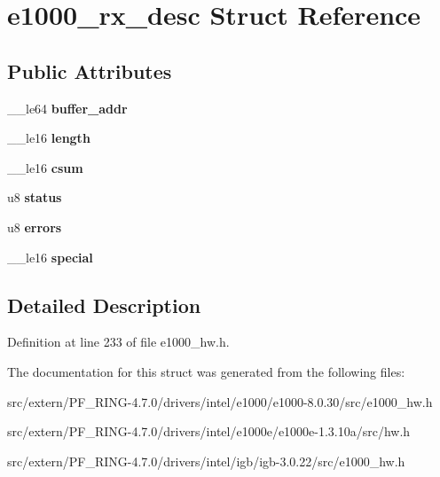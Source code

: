 \hypertarget{structe1000__rx__desc}{
\section{e1000\_\-rx\_\-desc Struct Reference}
\label{structe1000__rx__desc}
}
\subsection*{Public Attributes}
\begin{DoxyCompactItemize}
\item 
\hypertarget{structe1000__rx__desc_acadacc730a6c13cd4bfaea57293bcc6e}{
\_\-\_\-le64 {\bfseries buffer\_\-addr}}
\label{structe1000__rx__desc_acadacc730a6c13cd4bfaea57293bcc6e}

\item 
\hypertarget{structe1000__rx__desc_ae402b87f2ca726c23148f90b55e9b92e}{
\_\-\_\-le16 {\bfseries length}}
\label{structe1000__rx__desc_ae402b87f2ca726c23148f90b55e9b92e}

\item 
\hypertarget{structe1000__rx__desc_ab9239224d6d77002327d0f0809648f5b}{
\_\-\_\-le16 {\bfseries csum}}
\label{structe1000__rx__desc_ab9239224d6d77002327d0f0809648f5b}

\item 
\hypertarget{structe1000__rx__desc_a810f7d117dca2cba78b290e50840283d}{
u8 {\bfseries status}}
\label{structe1000__rx__desc_a810f7d117dca2cba78b290e50840283d}

\item 
\hypertarget{structe1000__rx__desc_a601904e57979b1e95bb3c1a5950946b9}{
u8 {\bfseries errors}}
\label{structe1000__rx__desc_a601904e57979b1e95bb3c1a5950946b9}

\item 
\hypertarget{structe1000__rx__desc_a29296807f2de0bc9b68cb42c1ad298df}{
\_\-\_\-le16 {\bfseries special}}
\label{structe1000__rx__desc_a29296807f2de0bc9b68cb42c1ad298df}

\end{DoxyCompactItemize}


\subsection{Detailed Description}


Definition at line 233 of file e1000\_\-hw.h.



The documentation for this struct was generated from the following files:\begin{DoxyCompactItemize}
\item 
src/extern/PF\_\-RING-\/4.7.0/drivers/intel/e1000/e1000-\/8.0.30/src/e1000\_\-hw.h\item 
src/extern/PF\_\-RING-\/4.7.0/drivers/intel/e1000e/e1000e-\/1.3.10a/src/hw.h\item 
src/extern/PF\_\-RING-\/4.7.0/drivers/intel/igb/igb-\/3.0.22/src/e1000\_\-hw.h\end{DoxyCompactItemize}
